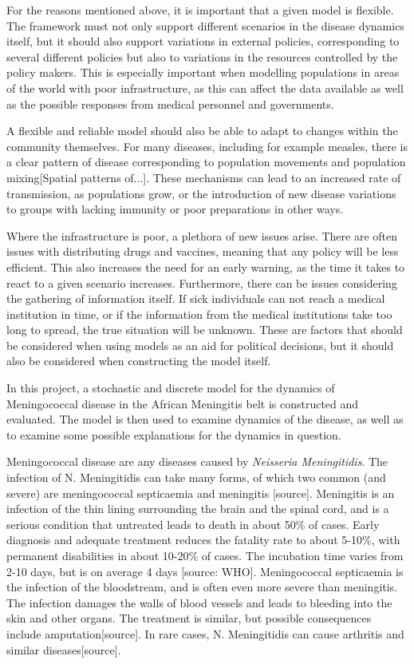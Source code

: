 \documentclass[10pt,a4paper]{article}
\begin{document}
For the reasons mentioned above, it is important that a given model is flexible. The framework must not only support different scenarios in the disease dynamics itself, but it should also support variations in external policies, corresponding to several different policies but also to variations in the resources controlled by the policy makers. This is especially important when modelling populations in areas of the world with poor infrastructure, as this can affect the data available as well as the possible responses from medical personnel and governments.

A flexible and reliable model should also be able to adapt to changes within the community themselves. For many diseases, including for example measles, there is a clear pattern of disease corresponding to population movements and population mixing[Spatial patterns of...]. These mechanisms can lead to an increased rate of transmission, as populations grow, or the introduction of new disease variations to groups with lacking immunity or poor preparations in other ways.

Where the infrastructure is poor, a plethora of new issues arise. There are often issues with distributing drugs and vaccines, meaning that any policy will be less efficient. This also increases the need for an early warning, as the time it takes to react to a given scenario increases. Furthermore, there can be issues considering the gathering of information itself. If sick individuals can not reach a medical institution in time, or if the information from the medical institutions take too long to spread, the true situation will be unknown. These are factors that should be considered when using models as an aid for political decisions, but it should also be considered when constructing the model itself.

In this project, a stochastic and discrete model for the dynamics of Meningococcal disease in the African Meningitis belt is constructed and evaluated. The model is then used to examine dynamics of the disease, as well as to examine some possible explanations for the dynamics in question.

Meningococcal disease are any diseases caused by \emph{Neisseria Meningitidis}. The infection of N. Meningitidis can take many forms, of which two common (and severe) are meningococcal septicaemia and meningitis [source]. Meningitis is an infection of the thin lining surrounding the brain and the spinal cord, and is a serious condition that untreated leads to death in about 50\% of cases. Early diagnosis and adequate treatment reduces the fatality rate to about 5-10\%, with permanent disabilities in about 10-20\% of cases. The incubation time varies from 2-10 days, but is on average 4 days [source: WHO]. Meningococcal septicaemia is the infection of the bloodstream, and is often even more severe than meningitis. The infection damages the walls of blood vessels and leads to bleeding into the skin and other organs. The treatment is similar, but possible consequences include amputation[source]. In rare cases, N. Meningitidis can cause arthritis and similar diseases[source].
\end{document}
